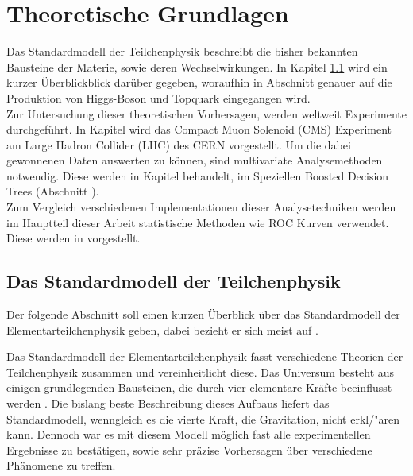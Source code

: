 \chapter{Theoretische Grundlagen}
\label{ch:Theorie}

{}	%

Das Standardmodell der Teilchenphysik beschreibt die bisher bekannten Bausteine der Materie, sowie deren Wechselwirkungen. In Kapitel \ref{ch:Theorie:sec:Standardmodell} wird ein kurzer \"Uberblickblick dar\"uber gegeben, woraufhin in Abschnitt \cite{ch:Theorie:subsec:ttH} genauer auf die Produktion von Higgs-Boson und Topquark eingegangen wird.\\
Zur Untersuchung dieser theoretischen Vorhersagen, werden weltweit Experimente durchgef\"uhrt. In Kapitel \cite{ch:Experiment} wird das Compact Muon Solenoid (CMS) Experiment am Large Hadron Collider (LHC) des CERN vorgestellt. Um die dabei gewonnenen Daten auswerten zu k\"onnen, sind multivariate Analysemethoden notwendig. Diese werden in Kapitel \cite{ch:Theorie:sec:Algorithmen} behandelt, im Speziellen Boosted Decision Trees (Abschnitt \cite{ch:Algorithmen:subsec:BDT}).\\
Zum Vergleich verschiedenen Implementationen dieser Analysetechniken werden im Hauptteil dieser Arbeit statistische Methoden wie ROC Kurven verwendet. Diese werden in \cite{ch:Theorie:sec:statistischeMethoden} vorgestellt.

\section{Das Standardmodell der Teilchenphysik}
\label{ch:Theorie:sec:Standardmodell}

Der folgende Abschnitt soll einen kurzen \"Uberblick \"uber das Standardmodell der Elementarteilchenphysik geben, dabei bezieht er sich meist auf \cite{SWB-39819646X}.

Das Standardmodell der Elementarteilchenphysik fasst verschiedene Theorien der Teilchenphysik zusammen und vereinheitlicht diese.  Das Universum besteht aus einigen grundlegenden Bausteinen, die durch vier elementare Kr\"afte beeinflusst werden \cite{O'Luanaigh:1997201}. Die bislang beste Beschreibung dieses Aufbaus liefert das Standardmodell, wenngleich es die vierte Kraft, die Gravitation, nicht erkl/"aren kann. Dennoch war es mit diesem Modell m\"oglich fast alle experimentellen Ergebnisse zu best\"atigen, sowie sehr pr\"azise Vorhersagen \"uber verschiedene Ph\"anomene zu treffen.

